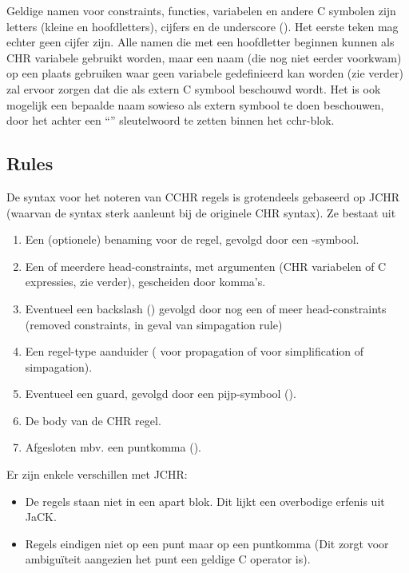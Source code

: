 Geldige namen voor constraints, functies, variabelen en andere C symbolen zijn letters (kleine en hoofdletters), cijfers en de underscore (\code{\_}). Het eerste teken mag echter geen cijfer zijn. Alle namen die met een hoofdletter beginnen kunnen als CHR variabele gebruikt worden, maar een naam (die nog niet eerder voorkwam) op een plaats gebruiken waar geen variabele gedefinieerd kan worden (zie verder) zal ervoor zorgen dat die als extern C symbool beschouwd wordt. Het is ook mogelijk een bepaalde naam sowieso als extern symbool te doen beschouwen, door het achter een ``'' sleutelwoord te zetten binnen het cchr-blok.

\subsection{Rules}

De syntax voor het noteren van CCHR regels is grotendeels gebaseerd op JCHR (waarvan de syntax sterk aanleunt bij de
originele CHR syntax). Ze bestaat uit \begin{enumerate}
  \item Een (optionele) benaming voor de regel, gevolgd door een -symbool.
  \item Een of meerdere head-constraints, met argumenten (CHR variabelen of C expressies, zie verder), gescheiden door komma's.
  \item Eventueel een backslash (\code{$\backslash$}) gevolgd door nog een of meer head-constraints (removed constraints, in geval van simpagation rule)
  \item Een regel-type aanduider (\code{==>} voor propagation of \code{<=>} voor simplification of simpagation).
  \item Eventueel een guard, gevolgd door een pijp-symbool (\code{|}).
  \item De body van de CHR regel.
  \item Afgesloten mbv. een puntkomma (\code{;}).
\end{enumerate}

Er zijn enkele verschillen met JCHR: \begin{itemize}
  \item De regels staan niet in een apart  blok. Dit lijkt een overbodige erfenis uit JaCK.
  \item Regels eindigen niet op een punt maar op een puntkomma (Dit zorgt voor ambigu\"iteit aangezien het punt een geldige
        C operator is).
\end{itemize}

